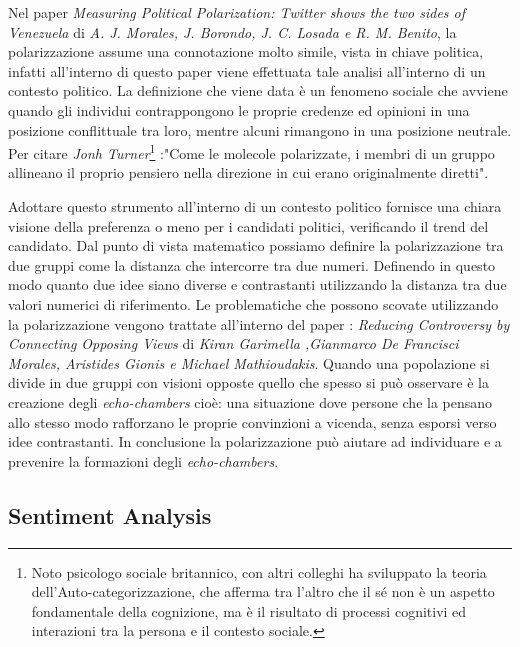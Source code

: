 Nel paper \textit{Measuring Political Polarization: Twitter shows the two sides of Venezuela} di \textit{A. J. Morales, J. Borondo, J. C. Losada e R. M. Benito}, la polarizzazione assume una connotazione molto simile, vista in chiave politica, infatti all'interno di questo paper viene effettuata tale analisi all'interno di un contesto politico. 
La definizione che viene data è un fenomeno sociale che avviene quando gli individui contrappongono le proprie credenze ed opinioni in una posizione conflittuale tra loro, mentre alcuni rimangono in una posizione neutrale.
Per citare \textit{Jonh Turner}\footnote{Noto psicologo sociale britannico, con altri colleghi ha sviluppato la teoria dell'Auto-categorizzazione, che afferma tra l'altro che il sé non è un aspetto fondamentale della cognizione, ma è il risultato di processi cognitivi ed interazioni tra la persona e il contesto sociale.} :"Come le molecole polarizzate, i membri di un gruppo allineano il proprio pensiero nella direzione in cui erano originalmente diretti". 

Adottare questo strumento all'interno di un contesto politico fornisce una chiara visione della preferenza o meno per i candidati politici, verificando il trend del candidato.
Dal punto di vista matematico possiamo definire la polarizzazione tra due gruppi come la distanza che intercorre tra due numeri. Definendo in questo modo quanto due idee siano diverse e contrastanti utilizzando la distanza tra due valori numerici di riferimento.
Le problematiche che possono scovate utilizzando la polarizzazione vengono trattate all'interno del paper : \textit{Reducing Controversy by Connecting Opposing Views} di \textit{Kiran Garimella ,Gianmarco De Francisci Morales, Aristides Gionis e Michael Mathioudakis}. Quando una popolazione si divide in due gruppi con visioni opposte quello che spesso si può osservare è la creazione degli \textit{echo-chambers} cioè: una situazione dove persone che la pensano allo stesso modo rafforzano le proprie convinzioni a vicenda, senza esporsi verso idee contrastanti.
In conclusione la polarizzazione può aiutare ad individuare e a prevenire la formazioni degli \textit{echo-chambers}.

\subsection{Sentiment Analysis}

